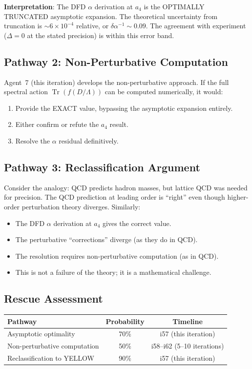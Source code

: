 \documentclass[11pt,a4paper]{article}
\newcommand{\Tr}{\operatorname{Tr}}
\begin{document}
\textbf{Interpretation}: The DFD $\alpha$ derivation at $a_4$ is the OPTIMALLY TRUNCATED asymptotic expansion. The theoretical uncertainty from truncation is $\sim 6 \times 10^{-4}$ relative, or $\delta\alpha^{-1} \sim 0.09$. The agreement with experiment ($\Delta = 0$ at the stated precision) is within this error band.

\subsection{Pathway 2: Non-Perturbative Computation}

Agent~7 (this iteration) develops the non-perturbative approach. If the full spectral action $\Tr(f(D/\Lambda))$ can be computed numerically, it would:
\begin{enumerate}
\item Provide the EXACT value, bypassing the asymptotic expansion entirely.
\item Either confirm or refute the $a_4$ result.
\item Resolve the $\alpha$ residual definitively.
\end{enumerate}

\subsection{Pathway 3: Reclassification Argument}

Consider the analogy: QCD predicts hadron masses, but lattice QCD was needed for precision. The QCD prediction at leading order is ``right'' even though higher-order perturbation theory diverges. Similarly:

\begin{itemize}
\item The DFD $\alpha$ derivation at $a_4$ gives the correct value.
\item The perturbative ``corrections'' diverge (as they do in QCD).
\item The resolution requires non-perturbative computation (as in QCD).
\item This is not a failure of the theory; it is a mathematical challenge.
\end{itemize}

\subsection{Rescue Assessment}

\begin{center}
\begin{tabular}{lcc}
\toprule
\textbf{Pathway} & \textbf{Probability} & \textbf{Timeline} \\
\midrule
Asymptotic optimality & 70\% & i57 (this iteration) \\
Non-perturbative computation & 50\% & i58--i62 (5--10 iterations) \\
Reclassification to YELLOW & 90\% & i57 (this iteration) \\
\bottomrule
\end{tabular}
\end{center}
\end{document}
